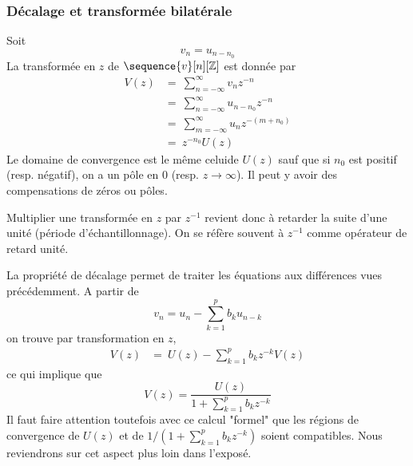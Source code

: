 \begin{proposition}
{\subsubsection{D\'{e}calage et transform\'{e}e bilat\'{e}rale}
Soit
$$
v_n =u_{n-n_{0}}
$$
La transform\'{e}e en $z$ de $\sequence{v}[n][\zset]$ est donn\'{e}e par
\begin{align*}
V(z) &=\ \sum_{n=-\infty}^{\infty} v_n z^{-n} \\
     &=\ \sum_{n=-\infty}^{\infty}u_{n-n_0}z^{-n} \\
     &=\ \sum_{m=-\infty}^{\infty}u_n z^{-(m+n_{0})} \\
     &=\ z^{-n_{0}} U(z)
\end{align*}
Le domaine de convergence est le m\^{e}me celuide $U(z)$ sauf que si $n_{0}$ est positif (resp. n\'{e}gatif), on a un p\^{o}le en $0$ (resp. $ z\rightarrow\infty$). Il peut y avoir des compensations de z\'{e}ros ou p\^{o}les.

Multiplier une transform\'{e}e en $z$ par $z^{-1}$ revient donc \`{a} retarder la suite d'une unit\'{e} (p\'{e}riode d'\'{e}chantillonnage). On se r\'{e}f\`{e}re souvent \`{a} $z^{-1}$ comme op\'{e}rateur de retard unit\'{e}.

La propri\'{e}t\'{e} de d\'{e}calage permet de traiter les \'{e}quations aux diff\'{e}rences vues pr\'{e}c\'{e}demment. A partir de
$$
v_n = u_n - \sum_{k=1}^p b_k u_{n-k}
$$
on trouve par transformation en $z$,
\begin{align*}
V(z) &=\ U(z)- \sum_{k=1}^p b_{k}z^{-k}V(z)
\end{align*}
ce qui implique que
\[
V(z) =\frac{U(z)}{1+ \sum_{k=1}^p b_{k}z^{-k}}
\]
Il faut faire attention toutefois avec ce calcul "formel" que les régions de convergence de $U(z)$ et de $1/ (1 + \sum_{k=1}^p b_k z^{-k})$ soient compatibles. Nous reviendrons sur cet aspect plus loin dans l'exposé.
}
\end{proposition}
